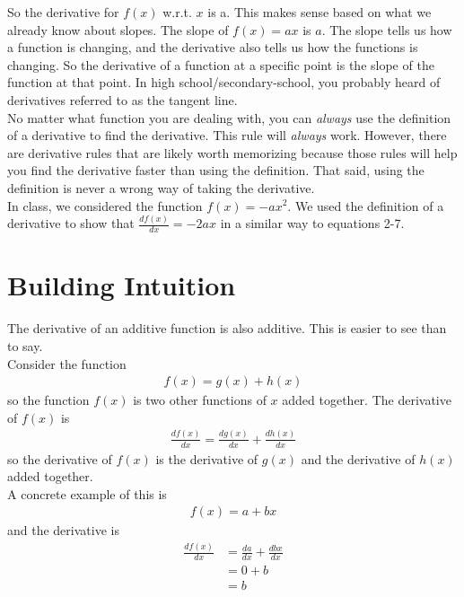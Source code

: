 \documentclass{article}
\begin{document}
So the derivative for $f(x)$ w.r.t. $x$ is a. This makes sense based on what we already know about slopes. The slope of $f(x) = ax$ is $a$. The slope tells us how a function is changing, and the derivative also tells us how the functions is changing. So the derivative of a function at a specific point is the slope of the function at that point. In high school/secondary-school, you probably heard of derivatives referred to as the tangent line.  \\

No matter what function you are dealing with, you can \textit{always} use the definition of a derivative to find the derivative. This rule will \textit{always} work. However, there are derivative rules that are likely worth memorizing because those rules will help you find the derivative faster than using the definition. That said, using the definition is never a wrong way of taking the derivative.  \\

In class, we considered the function $f(x) = -ax^2$. We used the  definition of a derivative to show that $\frac{df(x)}{dx} = -2ax$ in a similar way to equations 2-7.

\section{Building Intuition}
The derivative of an additive function is also additive. This is easier to see than to say. \\

Consider the function 
\begin{align}
    f(x) = g(x) + h(x)
\end{align}
so the function $f(x)$ is two other functions of $x$ added together. The derivative of $f(x)$ is 
\begin{align}
    \frac{df(x)}{dx} = \frac{dg(x)}{dx}  + \frac{dh(x)}{dx}
\end{align}
 so the derivative of $f(x)$ is the derivative of $g(x)$ and the derivative of $h(x)$ added together. \\

 A concrete example of this is 
\begin{align*}
    f(x) = a +bx
\end{align*}
and the derivative is 
\begin{align*}
    \frac{df(x)}{dx} &= \frac{d a }{dx} + \frac{d bx}{dx}\\
    &= 0+b\\
    &=b
\end{align*}
\end{document}
